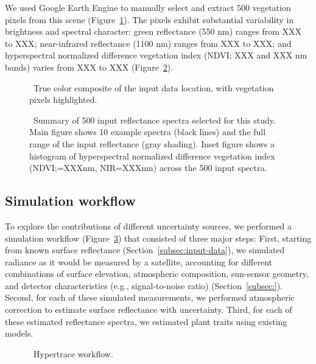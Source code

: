 \documentclass[draft]{agujournal2019}
\begin{document}
\fussy  %
We used Google Earth Engine to manually select and extract 500 vegetation pixels from this scene (Figure~\ref{fig:sitemap}).
The pixels exhibit substantial variability in brightness and spectral character:
green reflectance (550 nm) ranges from XXX to XXX;
near-infrared reflectance (1100 nm) ranges from XXX to XXX;
and hyperspectral normalized difference vegetation index (NDVI; XXX and XXX nm bands) varies from XXX to XXX (Figure~\ref{fig:input-summary}).

\begin{figure}[ht]
  \centering
  \caption{\label{fig:sitemap} \
    True color composite of the input data location, with vegetation pixels highlighted.
  }
\end{figure}

\begin{figure}[ht]
  \centering
  \caption{\label{fig:input-summary} \
    Summary of 500 input reflectance spectra selected for this study.
    Main figure shows 10 example spectra (black lines) and the full range of the input reflectance (gray shading).
    Inset figure shows a histogram of hyperspectral normalized difference vegetation index (NDVI;\@red=XXXnm, NIR=XXXnm) across the 500 input spectra.
  }
\end{figure}


\subsection{Simulation workflow}\label{subsec:workflow}

To explore the contributions of different uncertainty sources, we performed a simulation workflow (Figure~\ref{fig:workflow}) that consisted of three major steps:
First, starting from known surface reflectance (Section~\ref{subsec:input-data}), we simulated radiance as it would be measured by a satellite, accounting for different combinations of surface elevation, atmospheric composition, sun-sensor geometry, and detector characteristics (e.g., signal-to-noise ratio) (Section~\ref{subsec:}).
Second, for each of these simulated measurements, we performed atmospheric correction to estimate surface reflectance with uncertainty.
Third, for each of these estimated reflectance spectra, we estimated plant traits using existing models.

\begin{figure}[ht]
  \centering
  \caption{\label{fig:workflow}\
    Hypertrace workflow.
  }
\end{figure}
\end{document}
